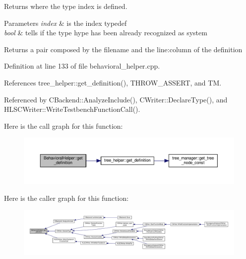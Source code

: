 Returns where the type index is defined. 


\begin{DoxyParams}{Parameters}
{\em index} & is the index typedef \\
\hline
{\em bool} & tells if the type hype has been already recognized as system \\
\hline
\end{DoxyParams}
\begin{DoxyReturn}{Returns}
a pair composed by the filename and the line\+:column of the definition 
\end{DoxyReturn}


Definition at line 133 of file behavioral\+\_\+helper.\+cpp.



References tree\+\_\+helper\+::get\+\_\+definition(), T\+H\+R\+O\+W\+\_\+\+A\+S\+S\+E\+RT, and TM.



Referenced by C\+Backend\+::\+Analyze\+Include(), C\+Writer\+::\+Declare\+Type(), and H\+L\+S\+C\+Writer\+::\+Write\+Testbench\+Function\+Call().

Here is the call graph for this function\+:
\nopagebreak
\begin{figure}[H]
\begin{center}
\leavevmode
\includegraphics[width=350pt]{dd/db2/classBehavioralHelper_a3cc24dd0e8e6e4e37fe28f18f73407bd_cgraph}
\end{center}
\end{figure}
Here is the caller graph for this function\+:
\nopagebreak
\begin{figure}[H]
\begin{center}
\leavevmode
\includegraphics[width=350pt]{dd/db2/classBehavioralHelper_a3cc24dd0e8e6e4e37fe28f18f73407bd_icgraph}
\end{center}
\end{figure}
\mbox{\label{classBehavioralHelper_a1ce91e3194698e93726ab8cf2f427dd0}} 
